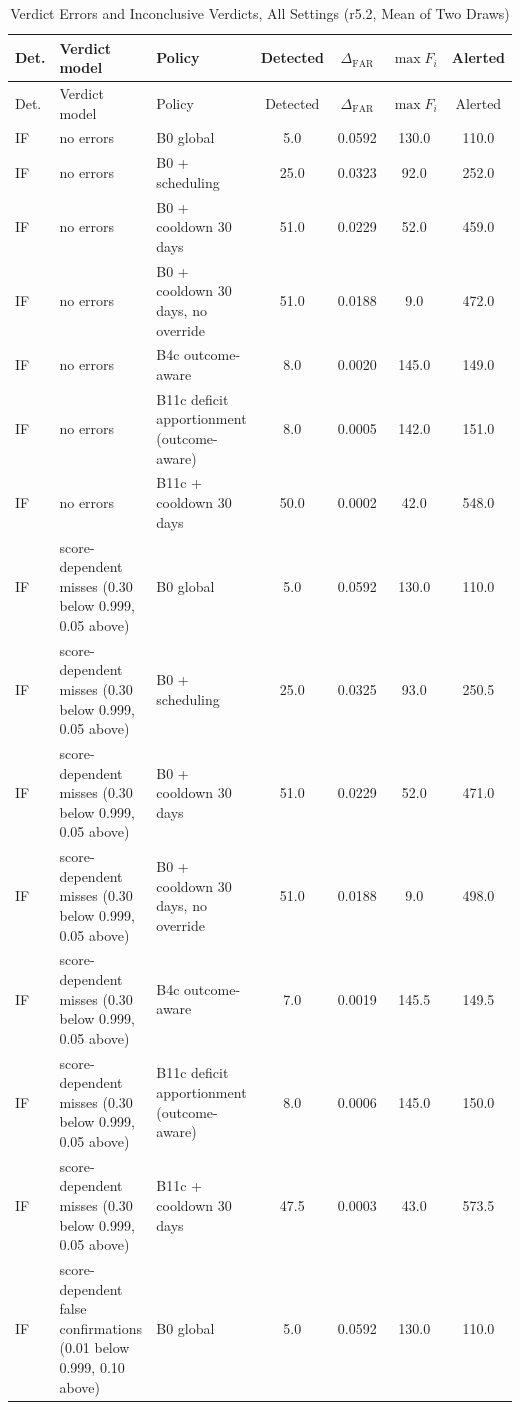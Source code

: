 \begin{longtable}{lp{5.2cm}p{4.4cm}cccc}
\caption{Verdict Errors and Inconclusive Verdicts, All Settings (r5.2, Mean of Two Draws)\label{tab:e-l4-r52}}\\
\toprule
Det. & Verdict model & Policy & Detected & $\Delta_{\mathrm{FAR}}$ & $\max F_i$ & Alerted \\
\midrule
\endfirsthead
\toprule
Det. & Verdict model & Policy & Detected & $\Delta_{\mathrm{FAR}}$ & $\max F_i$ & Alerted \\
\midrule
\endhead
IF & no errors & B0 global & 5.0 & 0.0592 & 130.0 & 110.0 \\
IF & no errors & B0 + scheduling & 25.0 & 0.0323 & 92.0 & 252.0 \\
IF & no errors & B0 + cooldown 30 days & 51.0 & 0.0229 & 52.0 & 459.0 \\
IF & no errors & B0 + cooldown 30 days, no override & 51.0 & 0.0188 & 9.0 & 472.0 \\
IF & no errors & B4c outcome-aware & 8.0 & 0.0020 & 145.0 & 149.0 \\
IF & no errors & B11c deficit apportionment (outcome-aware) & 8.0 & 0.0005 & 142.0 & 151.0 \\
IF & no errors & B11c + cooldown 30 days & 50.0 & 0.0002 & 42.0 & 548.0 \\
IF & score-dependent misses (0.30 below 0.999, 0.05 above) & B0 global & 5.0 & 0.0592 & 130.0 & 110.0 \\
IF & score-dependent misses (0.30 below 0.999, 0.05 above) & B0 + scheduling & 25.0 & 0.0325 & 93.0 & 250.5 \\
IF & score-dependent misses (0.30 below 0.999, 0.05 above) & B0 + cooldown 30 days & 51.0 & 0.0229 & 52.0 & 471.0 \\
IF & score-dependent misses (0.30 below 0.999, 0.05 above) & B0 + cooldown 30 days, no override & 51.0 & 0.0188 & 9.0 & 498.0 \\
IF & score-dependent misses (0.30 below 0.999, 0.05 above) & B4c outcome-aware & 7.0 & 0.0019 & 145.5 & 149.5 \\
IF & score-dependent misses (0.30 below 0.999, 0.05 above) & B11c deficit apportionment (outcome-aware) & 8.0 & 0.0006 & 145.0 & 150.0 \\
IF & score-dependent misses (0.30 below 0.999, 0.05 above) & B11c + cooldown 30 days & 47.5 & 0.0003 & 43.0 & 573.5 \\
IF & score-dependent false confirmations (0.01 below 0.999, 0.10 above) & B0 global & 5.0 & 0.0592 & 130.0 & 110.0 \\

\end{longtable}
